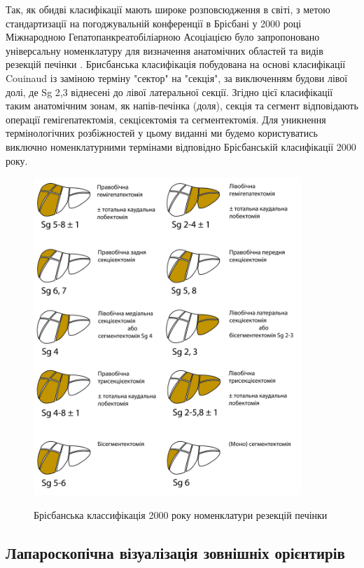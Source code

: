 \begin{refsection}
Так, як обидві класифікації мають широке розповсюдження в світі, з метою стандартизації на погоджувальній конференції в Брісбані у 2000 році Міжнародною Гепатопанкреатобіліарною Асоціацією було запропоновано універсальну номенклатуру для визначення анатомічних областей та видів резекцій печінки \cite{Pang2000}. Брисбанська класифікація побудована на основі класифікації Couinaud із заміною терміну "сектор" на "секція", за виключенням будови лівої долі, де Sg 2,3 віднесені до лівої латеральної секції. Згідно цієї класифікації таким анатомічним зонам, як напів-печінка (доля), секція та сегмент відповідають операції гемігепатектомія, секцієектомія та сегментектомія. Для уникнення термінологічних розбіжностей у цьому виданні ми будемо користуватись виключно номенклатурними термінами відповідно Брісбанській класифікації 2000 року.

\begin{figure}[htbp]
\caption{Брісбанська классифікація 2000 року номенклатури резекцій печінки}
\centering
\includegraphics[width=0.9\textwidth]{Illustrations/Chapter_01/Brisbane.jpg}
\label{fig:Brisbane}
\end{figure}

\subsection{Лапароскопічна візуалізація зовнішніх орієнтирів}


\end{refsection}
